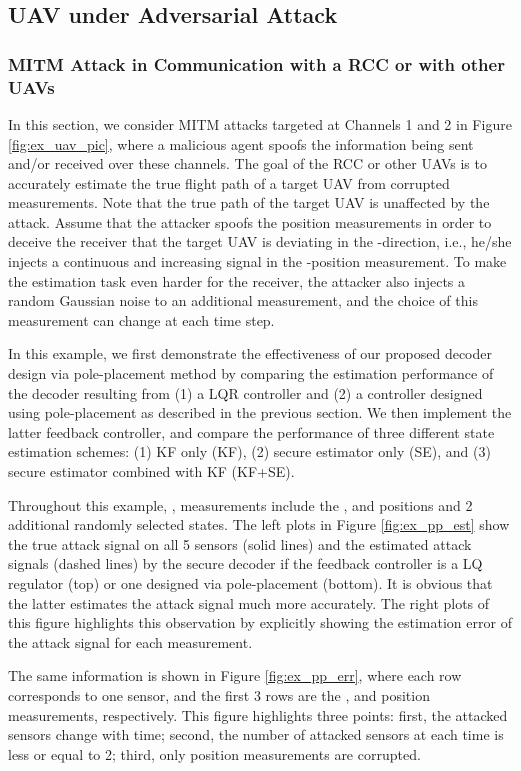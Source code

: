 \documentclass[journal]{IEEEtran}
\begin{document}
\subsection{UAV under Adversarial Attack}

\subsubsection{MITM Attack in Communication with a RCC or with other UAVs} \label{sec:uav_utm}
In this section, we consider MITM attacks targeted at Channels 1 and 2 in Figure \ref{fig:ex_uav_pic}, where a malicious agent spoofs the information being sent and/or received over these channels. The goal of the RCC or other UAVs is to accurately estimate the true flight path of a target UAV from corrupted measurements. 
Note that the true path of the target UAV is unaffected by the attack.
Assume that the attacker spoofs the position measurements in order to deceive the receiver that the target UAV is deviating in the -direction, i.e., he/she injects a continuous and increasing signal in the -position measurement.
To make the estimation task even harder for the receiver, the attacker also injects a random Gaussian noise to an additional measurement, and the choice of this measurement can change at each time step. 

In this example, we first demonstrate the effectiveness of our proposed decoder design via pole-placement method by comparing the estimation performance of the decoder resulting from (1) a LQR controller and (2) a controller designed using pole-placement as described in the previous section.
We then implement the latter feedback controller, and compare the performance of three different state estimation schemes: (1) KF only (KF), (2) secure estimator only (SE), and (3) secure estimator combined with KF (KF+SE). 

Throughout this example, , measurements include the ,  and  positions and 2 additional randomly selected states. The left plots in Figure \ref{fig:ex_pp_est} show the true attack signal on all 5 sensors (solid lines) and the estimated attack signals (dashed lines) by the secure decoder if the feedback controller is a LQ regulator (top) or one designed via pole-placement (bottom). It is obvious that the latter estimates the attack signal much more accurately. The right plots of this figure highlights this observation by explicitly showing the estimation error of the attack signal for each measurement.

The same information is shown in Figure \ref{fig:ex_pp_err}, where each row corresponds to one sensor, and the first 3 rows are the ,  and  position measurements, respectively. This figure highlights three points: first, the attacked sensors change with time; second, the number of attacked sensors at each time  is less or equal to 2; third, only position measurements are corrupted.
\end{document}
